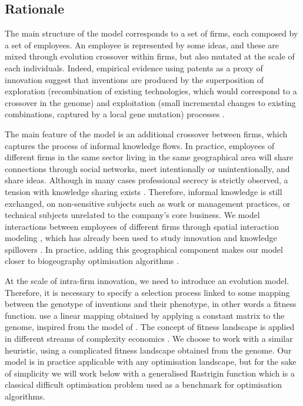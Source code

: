 \documentclass[letterpaper]{article}
\begin{document}
\subsection{Rationale}

The main structure of the model corresponds to a set of firms, each composed by a set of employees. An employee is represented by some ideas, and these are mixed through evolution crossover within firms, but also mutated at the scale of each individuals. Indeed, empirical evidence using patents as a proxy of innovation suggest that inventions are produced by the superposition of exploration (recombination of existing technologies, which would correspond to a crossover in the genome) and exploitation (small incremental changes to existing combinations, captured by a local gene mutation) processes \citep{youn2015invention}. 

The main feature of the model is an additional crossover between firms, which captures the process of informal knowledge flows. In practice, employees of different firms in the same sector living in the same geographical area will share connections through social networks, meet intentionally or unintentionally, and share ideas. Although in many cases professional secrecy is strictly observed, a tension with knowledge sharing exists \citep{rouyre2019managing}. Therefore, informal knowledge is still exchanged, on non-sensitive subjects such as work or management practices, or technical subjects unrelated to the company's core business. We model interactions between employees of different firms through spatial interaction modeling \citep{wilson1975some}, which has already been used to study innovation and knowledge spillovers \citep{lesage2007knowledge}. In practice, adding this geographical component makes our model closer to biogeography optimisation algorithms \citep{simon2008biogeography}.

At the scale of intra-firm innovation, we need to introduce an evolution model. Therefore, it is necessary to specify a selection process linked to some mapping between the genotype of inventions and their phenotype, in other words a fitness function. \cite{ma2005agent} use a linear mapping obtained by applying a constant matrix to the genome, inspired from the model of \cite{kauffman1995technological}. The concept of fitness landscape is applied in different streams of complexity economics \citep{khraisha2020complex}. We choose to work with a similar heuristic, using a complicated fitness landscape obtained from the genome. Our model is in practice applicable with any optimisation landscape, but for the sake of simplicity we will work below with a generalised Rastrigin function which is a classical difficult optimisation problem used as a benchmark for optimisation algorithms.
\end{document}
